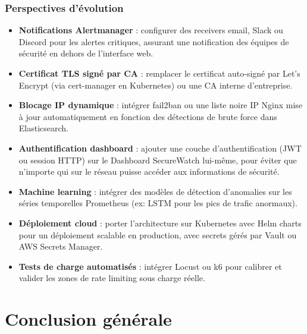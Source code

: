 \documentclass[12pt, a4paper]{report}
\begin{document}
\subsection{Perspectives d'évolution}

\begin{itemize}[leftmargin=*]
  \item \textbf{Notifications Alertmanager} : configurer des receivers email, Slack ou Discord pour les alertes critiques, assurant une notification des équipes de sécurité en dehors de l'interface web.
  \item \textbf{Certificat TLS signé par CA} : remplacer le certificat auto-signé par Let's Encrypt (via cert-manager en Kubernetes) ou une CA interne d'entreprise.
  \item \textbf{Blocage IP dynamique} : intégrer fail2ban ou une liste noire IP Nginx mise à jour automatiquement en fonction des détections de brute force dans Elasticsearch.
  \item \textbf{Authentification dashboard} : ajouter une couche d'authentification (JWT ou session HTTP) sur le Dashboard SecureWatch lui-même, pour éviter que n'importe qui sur le réseau puisse accéder aux informations de sécurité.
  \item \textbf{Machine learning} : intégrer des modèles de détection d'anomalies sur les séries temporelles Prometheus (ex: LSTM pour les pics de trafic anormaux).
  \item \textbf{Déploiement cloud} : porter l'architecture sur Kubernetes avec Helm charts pour un déploiement scalable en production, avec secrets gérés par Vault ou AWS Secrets Manager.
  \item \textbf{Tests de charge automatisés} : intégrer Locust ou k6 pour calibrer et valider les zones de rate limiting sous charge réelle.
\end{itemize}

\chapter*{Conclusion générale}
\end{document}
